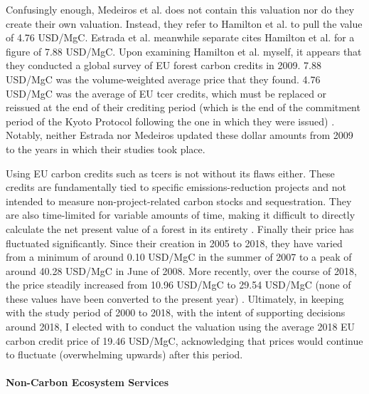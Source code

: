 Confusingly enough, Medeiros et al. does not contain this valuation nor do they create their own valuation. Instead, they refer to Hamilton et al. \cite{hamiltonStateForestCarbon2010} to pull the value of 4.76 USD/MgC. Estrada et al. meanwhile separate cites Hamilton et al. for a figure of 7.88 USD/MgC. Upon examining Hamilton et al. myself, it appears that they conducted a global survey of EU forest carbon credits in 2009. 7.88 USD/MgC was the volume-weighted average price that they found. 4.76 USD/MgC was the average of EU \ac{tcer} credits, which must be replaced or reissued at the end of their crediting period (which is the end of the commitment period of the Kyoto Protocol following the one in which they were issued) \cite{salinasNonpermanence2011}. Notably, neither Estrada nor Medeiros updated these dollar amounts from 2009 to the years in which their studies took place. 

Using EU carbon credits such as \acp{tcer} is not without its flaws either. These credits are fundamentally tied to specific emissions-reduction projects and not intended to measure non-project-related carbon stocks and sequestration. They are also time-limited for variable amounts of time, making it difficult to directly calculate the net present value of a forest in its entirety \cite{salinasNonpermanence2011}. Finally their price has fluctuated significantly. Since their creation in 2005 to 2018, they have varied from a minimum of around 0.10 USD/MgC in the summer of 2007 to a peak of around 40.28 USD/MgC in June of 2008. More recently, over the course of 2018, the price steadily increased from 10.96 USD/MgC to 29.54 USD/MgC (none of these values have been converted to the present year) \cite{EUCarbonPermits2023}. Ultimately, in keeping with the study period of 2000 to 2018, with the intent of supporting decisions around 2018, I elected with to conduct the valuation using the average 2018 EU carbon credit price of 19.46 USD/MgC, acknowledging that prices would continue to fluctuate (overwhelming upwards) after this period. 

\paragraph{Non-Carbon Ecosystem Services} \leavevmode\newline

